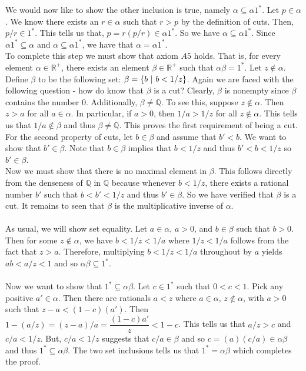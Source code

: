 \documentclass[12pt]{article}
\begin{document}
\indent We would now like to show the other inclusion is true, namely $\alpha \subseteq \alpha 1^{*}$. Let $p \in \alpha$. We know there exists an $r \in \alpha$ such that $r>p$ by the definition of cuts. Then, $p/r \in 1^{*}$. This tells us that, $p = r(p/r) \in \alpha 1^{*}$. So we have $\alpha \subseteq \alpha 1^{*}$. Since $\alpha 1^{*}  \subseteq \alpha$ and $\alpha  \subseteq \alpha 1^{*}$, we have that $\alpha = \alpha 1^{*}$. \\ 

To complete this step we must show that axiom $A5$ holds. That is, for every element $\alpha \in \mathbb{R}^{+}$, there exists an element $\beta \in \mathbb{R}^{+}$ such that $\alpha \beta = 1^{*}$. Let $z \notin \alpha$. Define $\beta$ to be the following set: $\beta = \left\{b ~|~b<1/z\right\}$. Again we are faced with the following question - how do know that $\beta$ is a cut? Clearly, $\beta$ is nonempty since $\beta$ contains the number 0. Additionally, $\beta \neq \mathbb{Q}$. To see this, suppose $z \notin \alpha$. Then $z>a$ for all $a \in \alpha$. In particular, if $a>0$, then $1/a>1/z$ for all $z \notin \alpha$. This tells us that $1/a \notin \beta$ and thus $\beta \neq \mathbb{Q}$. This proves the first requirement of being a cut. \\ 

For the second property of cuts, let $b \in \beta$ and assume that $b'<b$. We want to show that $b' \in \beta$. Note that $b \in \beta$  implies that $b < 1/z$ and thus $b'<b<1/z$ so $b' \in \beta$. \\ 
Now we must show that there is no maximal element in $\beta$. This follows directly from the denseness of $\mathbb{Q}$ in $\mathbb{Q}$ because whenever $b< 1/z$,  there exists a rational number $b'$ such that $b<b'<1/z$ and thus $b' \in \beta$. So we have verified that $\beta$ is a cut. It remains to seen that $\beta$ is the multiplicative inverse of $\alpha$. \\ \\

As usual, we will show set equality. Let $a \in \alpha$, $a>0$, and $b \in \beta$ such that $b>0$. Then for some $z \notin \alpha$, we have $b<1/z<1/a$ where $1/z<1/a$ follows from the fact that $z>a$. Therefore, multiplying $b<1/z<1/a$ throughout by $a$ yields $ab<a/z<1$ and so $\alpha \beta \subseteq 1^{*}$. \\ \\
\indent Now we want to show that $1^{*} \subseteq \alpha \beta$. Let $c \in 1^{*}$ such that $0<c<1$. Pick any positive $a' \in \alpha$. Then there are rationals $a<z$ where $a \in \alpha$, $z \notin \alpha$, with $a>0$ such that $z-a<(1-c)(a')$. Then $1 - (a/z) = (z-a)/a = \dfrac{(1-c)a'}{z} < 1-c$. This tells us that $a/z > c$ and $c/a < 1/z$. But, $c/a < 1/z$ suggests that $c/a \in \beta$ and so $c=(a)(c/a) \in \alpha \beta$ and thus $1^{*} \subseteq \alpha \beta$. The two set inclusions tells us that $1^{*} = \alpha \beta$ which completes the proof.  \\ \\
\end{document}
